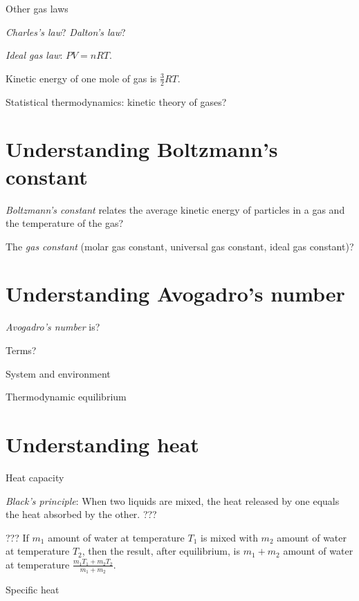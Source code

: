 Other gas laws

\emph{Charles's law}?
\emph{Dalton's law}?


\emph{Ideal gas law}: \( PV = nRT \).

Kinetic energy of one mole of gas is \( \frac{3}{2} RT \).

Statistical thermodynamics: kinetic theory of gases?

\section{Understanding Boltzmann's constant}

\emph{Boltzmann's constant} relates the average kinetic energy of particles in a gas and the temperature of the gas?

The \emph{gas constant} (molar gas constant, universal gas constant, ideal gas constant)?

\section{Understanding Avogadro's number}

\emph{Avogadro's number} is?

Terms?

System and environment

Thermodynamic equilibrium

\section{Understanding heat}

Heat capacity

\emph{Black's principle}:
When two liquids are mixed, the heat released by one equals the heat absorbed by the other.
???

???
If \(m_1\) amount of water at temperature \(T_1\) is mixed with \(m_2\) amount of water at temperature \(T_2\),
then the result, after equilibrium, is \(m_1+m_2\) amount of water at temperature \(\frac{m_1 T_1 + m_2 T_2}{m_1+m_2}\).

Specific heat

